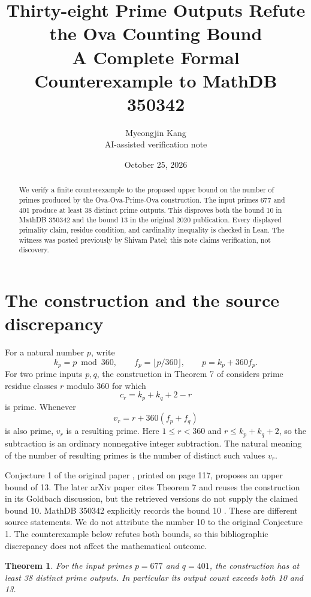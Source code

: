 \documentclass[11pt]{article}
\title{Thirty-eight Prime Outputs Refute the Ova Counting Bound\\A Complete Formal Counterexample to MathDB 350342}
\author{Myeongjin Kang\\\small AI-assisted verification note}
\date{October 25, 2026}
\newtheorem{theorem}{Theorem}
\begin{document}
\maketitle
\begin{abstract}
We verify a finite counterexample to the proposed upper bound on the number of primes produced by the Ova-Ova-Prime-Ova construction. The input primes 677 and 401 produce at least 38 distinct prime outputs. This disproves both the bound 10 in MathDB 350342 and the bound 13 in the original 2020 publication. Every displayed primality claim, residue condition, and cardinality inequality is checked in Lean. The witness was posted previously by Shivam Patel; this note claims verification, not discovery.
\end{abstract}

\section{The construction and the source discrepancy}
For a natural number $p$, write
\[
 k_p=p\bmod360,\qquad f_p=\lfloor p/360\rfloor,
 \qquad p=k_p+360f_p.
\]
For two prime inputs $p,q$, the construction in Theorem 7 of \cite{A2020} considers prime residue classes $r$ modulo 360 for which
\[
 c_r=k_p+k_q+2-r
\]
is prime. Whenever
\[
 v_r=r+360(f_p+f_q)
\]
is also prime, $v_r$ is a resulting prime. Here $1\leq r<360$ and $r\leq k_p+k_q+2$, so the subtraction is an ordinary nonnegative integer subtraction. The natural meaning of the number of resulting primes is the number of distinct such values $v_r$.

Conjecture 1 of the original paper \cite{A2020}, printed on page 117, proposes an upper bound of 13. The later arXiv paper \cite{A2021} cites Theorem 7 and reuses the construction in its Goldbach discussion, but the retrieved versions do not supply the claimed bound 10. MathDB 350342 explicitly records the bound 10 \cite{DB}. These are different source statements. We do not attribute the number 10 to the original Conjecture 1. The counterexample below refutes both bounds, so this bibliographic discrepancy does not affect the mathematical outcome.

\begin{theorem}\label{thm:main}
For the input primes $p=677$ and $q=401$, the construction has at least 38 distinct prime outputs. In particular its output count exceeds both 10 and 13.
\end{theorem}
\end{document}
